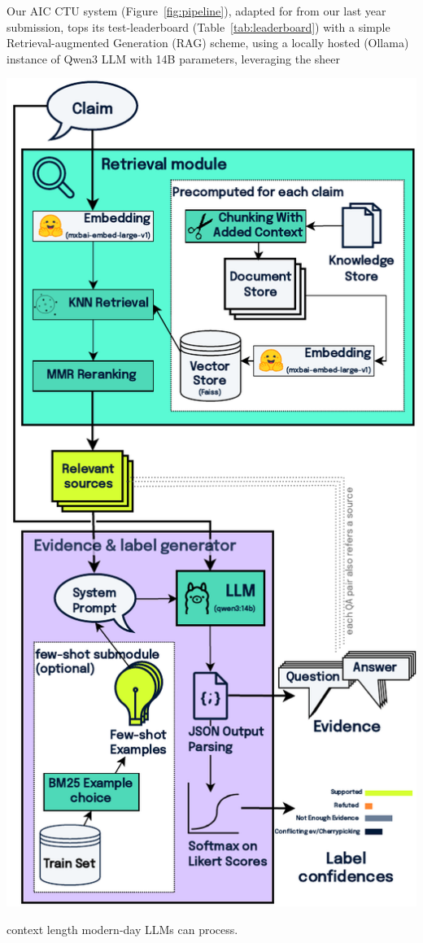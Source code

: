 Our AIC CTU system (Figure~\ref{fig:pipeline}), adapted for \averitec{} from our last year submission, tops its test-leaderboard (Table~\ref{tab:leaderboard}) with a simple Retrieval-augmented Generation (RAG) scheme, using a locally hosted (Ollama) instance of Qwen3 LLM with 14B parameters, leveraging the sheer
\begin{minipage}{\linewidth}
    \centering
    \includegraphics[width=\linewidth]{figures/pipeline.pdf}
    \label{fig:pipeline}
\vspace{1em}
\end{minipage}
context length modern-day LLMs can process.

